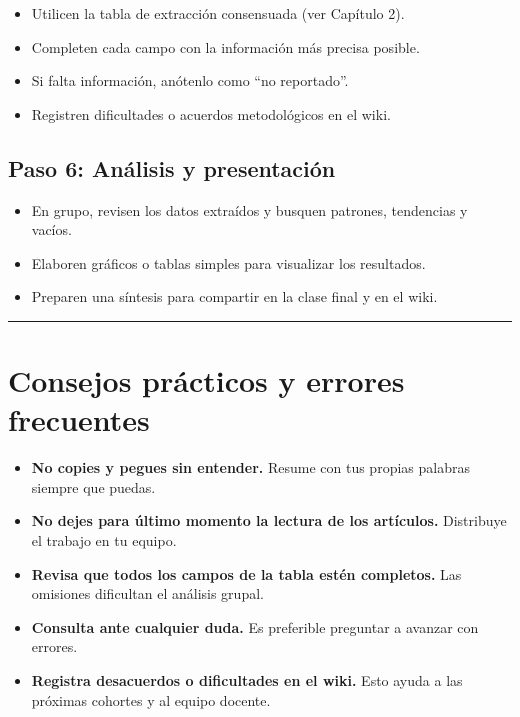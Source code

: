 \documentclass[
  letterpaper,
]{book}
\providecommand{\tightlist}{%
  \setlength{\itemsep}{0pt}\setlength{\parskip}{0pt}}\usepackage{longtable,booktabs,array}
\begin{document}
\begin{itemize}
\tightlist
\item
  Utilicen la tabla de extracción consensuada (ver Capítulo 2).
\item
  Completen cada campo con la información más precisa posible.
\item
  Si falta información, anótenlo como ``no reportado''.
\item
  Registren dificultades o acuerdos metodológicos en el wiki.
\end{itemize}

\subsection{Paso 6: Análisis y
presentación}\label{paso-6-anuxe1lisis-y-presentaciuxf3n}

\begin{itemize}
\tightlist
\item
  En grupo, revisen los datos extraídos y busquen patrones, tendencias y
  vacíos.
\item
  Elaboren gráficos o tablas simples para visualizar los resultados.
\item
  Preparen una síntesis para compartir en la clase final y en el wiki.
\end{itemize}

\begin{center}\rule{0.5\linewidth}{0.5pt}\end{center}

\section{Consejos prácticos y errores
frecuentes}\label{consejos-pruxe1cticos-y-errores-frecuentes}

\begin{itemize}
\tightlist
\item
  \textbf{No copies y pegues sin entender.} Resume con tus propias
  palabras siempre que puedas.
\item
  \textbf{No dejes para último momento la lectura de los artículos.}
  Distribuye el trabajo en tu equipo.
\item
  \textbf{Revisa que todos los campos de la tabla estén completos.} Las
  omisiones dificultan el análisis grupal.
\item
  \textbf{Consulta ante cualquier duda.} Es preferible preguntar a
  avanzar con errores.
\item
  \textbf{Registra desacuerdos o dificultades en el wiki.} Esto ayuda a
  las próximas cohortes y al equipo docente.
\end{itemize}
\end{document}
